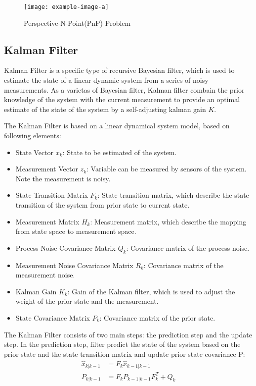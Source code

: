 \begin{figure}[htb]
    \centering
    \texttt{[image: example-image-a]}
    \caption{Perspective-N-Point(PnP) Problem}\label{F:test-a}
\end{figure}


\subsection{Kalman Filter}
Kalman Filter is a specific type of recursive Bayesian filter, which is used to estimate the state of a linear dynamic system from a series of noisy measurements. As a varietas of Bayesian filter, Kalman filter combain the prior knowledge of the system with the current measurement to provide an optimal estimate of the state of the system by a self-adjusting kalman gain $K$. 

The Kalman Filter is based on a linear dynamical system model, based on following elements:
\begin{itemize}
    \item State Vector $x_k$: State to be estimated of the  system.
    \item Measurement Vector $z_k$: Variable can be measured by sensors of the system. Note the measurement is noisy.
    \item State Transition Matrix $F_k$: State transition matrix, which describe the state transition of the system from prior state to current state.
    \item Measurement Matrix $H_k$: Measurement matrix, which describe the mapping from state space to measurement space.
    \item Process Noise Covariance Matrix $Q_k$: Covariance matrix of the process noise.
    \item Measurement Noise Covariance Matrix $R_k$: Covariance matrix of the measurement noise.
    \item Kalman Gain $K_k$: Gain of the Kalman filter, which is used to adjust the weight of the prior state and the measurement.
    \item State Covariance Matrix $P_k$: Covariance matrix of the prior state.
\end{itemize}

The Kalman Filter consists of two main steps: the prediction step and the update step. In the prediction step, filter predict the state of the system based on the prior state and the state transition matrix and update prior state covariance P:
\begin{equation}
    \begin{aligned}
        \hat{x}_{k|k-1} &= F_k \hat{x}_{k-1|k-1} \\
        P_{k|k-1} &= F_k P_{k-1|k-1} F_k^T + Q_k
    \end{aligned}
\end{equation}


